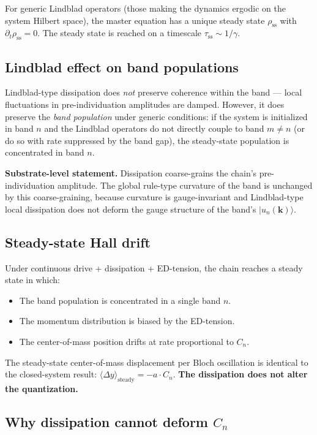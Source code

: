 \documentclass[11pt,a4paper]{article}
\begin{document}
For generic Lindblad operators (those making the dynamics ergodic on the system Hilbert space), the master equation has a unique steady state $\rho_{\mathrm{ss}}$ with $\partial_t\rho_{\mathrm{ss}} = 0$. The steady state is reached on a timescale $\tau_{\mathrm{ss}} \sim 1/\gamma$.

\subsection{Lindblad effect on band populations}

Lindblad-type dissipation does \emph{not} preserve coherence within the band --- local fluctuations in pre-individuation amplitudes are damped. However, it does preserve the \emph{band population} under generic conditions: if the system is initialized in band $n$ and the Lindblad operators do not directly couple to band $m \neq n$ (or do so with rate suppressed by the band gap), the steady-state population is concentrated in band $n$.

\textbf{Substrate-level statement.} Dissipation coarse-grains the chain's pre-individuation amplitude. The global rule-type curvature of the band is unchanged by this coarse-graining, because curvature is gauge-invariant and Lindblad-type local dissipation does not deform the gauge structure of the band's $|u_n(\mathbf{k})\rangle$.

\subsection{Steady-state Hall drift}

Under continuous drive + dissipation + ED-tension, the chain reaches a steady state in which:

\begin{itemize}[noitemsep]
  \item The band population is concentrated in a single band $n$.
  \item The momentum distribution is biased by the ED-tension.
  \item The center-of-mass position drifts at rate proportional to $C_n$.
\end{itemize}

The steady-state center-of-mass displacement per Bloch oscillation is identical to the closed-system result: $\langle\Delta y\rangle_{\mathrm{steady}} = -a\cdot C_n$. \textbf{The dissipation does not alter the quantization.}

\subsection{Why dissipation cannot deform $C_n$}
\end{document}
